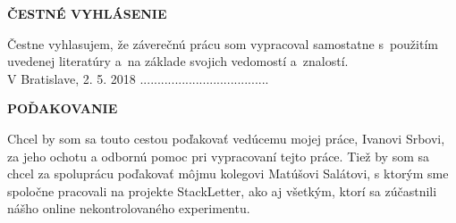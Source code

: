 

\newpage
\thispagestyle{plain}
\vspace*{19cm}
\begin{large}
\noindent
\textbf{ČESTNÉ VYHLÁSENIE} \\
\end{large}
\noindent
Čestne vyhlasujem, že záverečnú prácu som vypracoval samostatne s~použitím uvedenej literatúry a~na základe svojich
vedomostí a~znalostí.
\vspace*{1.5cm}\\
V Bratislave, 2. 5. 2018 \hspace*{6.9cm}.....................................\\
\hspace*{11.5cm} \Author
\afterpage{\blankpage}


\newpage
\thispagestyle{plain}
\vspace*{19cm}
\begin{large}
\noindent
\textbf{POĎAKOVANIE} \\
\end{large}
\noindent
Chcel by som sa touto cestou poďakovať vedúcemu mojej práce, Ivanovi Srbovi, za jeho ochotu a odbornú pomoc pri vypracovaní tejto práce.
Tiež by som sa chcel za spoluprácu poďakovať môjmu kolegovi Matúšovi Salátovi, s ktorým sme spoločne pracovali na projekte StackLetter,
ako aj všetkým, ktorí sa zúčastnili nášho online nekontrolovaného experimentu.
\afterpage{\blankpage}
